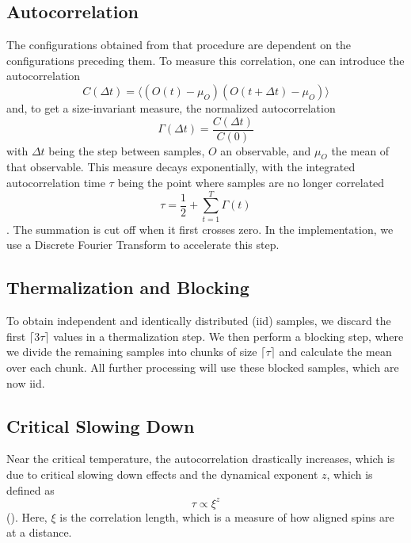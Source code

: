 	\subsection{Autocorrelation}
		The configurations obtained from that procedure are dependent on the configurations preceding them.  To measure this correlation, one can introduce the autocorrelation
		\begin{equation}
			C(\Delta t) = \langle(O(t) - \mu_O)(O(t + \Delta t) - \mu_O) \rangle
		\end{equation}
		\cite[eq. (41)]{bootstrap} and, to get a size-invariant measure, the normalized autocorrelation
		\begin{equation}
			\Gamma(\Delta t) = \frac{C(\Delta t)}{C(0)}
		\end{equation}
		\cite[eq. (43)]{bootstrap} with $\Delta t$ being the step between samples, $O$ an observable, and $\mu_O$ the mean of that observable. This measure decays exponentially, with the integrated autocorrelation time $\tau$ being the point where samples are no longer correlated
		\begin{equation}
			\tau = \frac{1}{2} + \sum^{T}_{t=1}{\Gamma(t)}
		\end{equation}
		\cite[eq. (46)]{bootstrap}. The summation is cut off when it first crosses zero. In the implementation, we use a Discrete Fourier Transform to accelerate this step.
		
	\subsection{Thermalization and Blocking}\label{sec:blocking}
		To obtain independent and identically distributed (iid) samples, we discard the first $\lceil 3\tau \rceil$ values in a thermalization step. We then perform a blocking step, where we divide the remaining samples into chunks of size $\lceil \tau \rceil$ and calculate the mean over each chunk. All further processing will use these blocked samples, which are now iid.
		
	\subsection{Critical Slowing Down}\label{sec:theo:critical_slowing_down}
		Near the critical temperature, the autocorrelation drastically increases, which is due to critical slowing down effects and the dynamical exponent $z$, which is defined as
		\begin{equation}
			\tau \propto \xi^z
		\end{equation}
		(\citet[eq. (6)]{bootstrap}). Here, $\xi$ is the correlation length, which is a measure of how aligned spins are at a distance.
		
